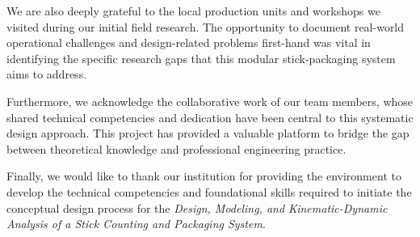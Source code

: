 We are also deeply grateful to the local production units and workshops we visited during our initial field research. The opportunity to document real-world operational challenges and design-related problems first-hand was vital in identifying the specific research gaps that this modular stick-packaging system aims to address.
\vspace{12pt}

Furthermore, we acknowledge the collaborative work of our team members, whose shared technical competencies and dedication have been central to this systematic design approach. This project has provided a valuable platform to bridge the gap between theoretical knowledge and professional engineering practice.
\vspace{12pt}

Finally, we would like to thank our institution for providing the environment to develop the technical competencies and foundational skills required to initiate the conceptual design process for the \textit{Design, Modeling, and Kinematic-Dynamic Analysis of a Stick Counting and Packaging System}.
